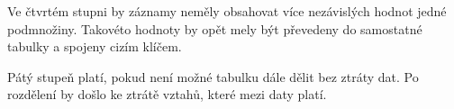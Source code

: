 Ve čtvrtém stupni by záznamy neměly obsahovat více nezávislých hodnot jedné podmnožiny. 
Takovéto hodnoty by opět mely být převedeny do samostatné tabulky a spojeny cizím klíčem.

Pátý stupeň platí, pokud není možné tabulku dále dělit bez ztráty dat. Po 
rozdělení by došlo ke ztrátě vztahů, které mezi daty platí.






















